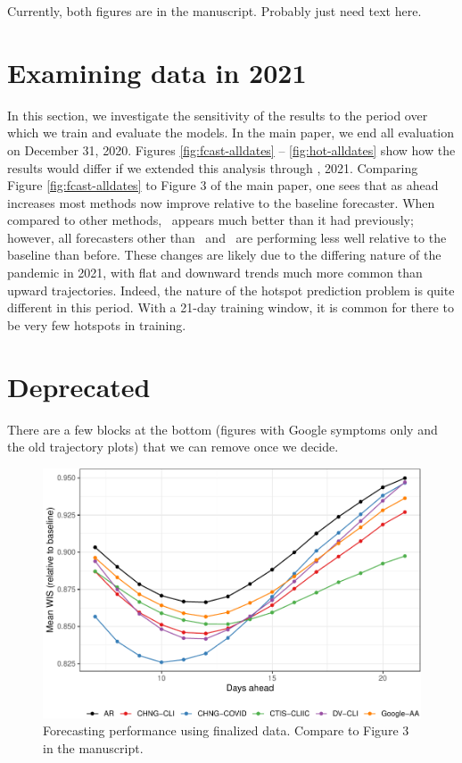 \documentclass[9pt,twoside,lineno]{pnas-new}
\begin{document}
Currently, both figures are in the manuscript. Probably just need text
here.

\hypertarget{examining-data-in-2021}{%
\section{Examining data in 2021}\label{examining-data-in-2021}}

In this section, we investigate the sensitivity of the results to the
period over which we train and evaluate the models.  In the main
paper, we end all evaluation on December 31, 2020.  Figures
\ref{fig:fcast-alldates} -- \ref{fig:hot-alldates} show how the
results would differ if we extended this analysis through , 2021. Comparing Figure \ref{fig:fcast-alldates} to Figure 3 of
the main paper, one sees that as ahead increases most methods now improve
relative to the baseline forecaster. When compared to other methods, \chngcli~appears much better than
it had previously; however, all forecasters other than \chngcov~and
\dv~are performing less well relative to the baseline than before.
These changes are likely due to the differing nature of the pandemic
in 2021, with flat and downward trends much more common than upward
trajectories.  Indeed, the nature of the hotspot prediction problem is
quite different in this period.  With a 21-day training window, it is
common for there to be very few hotspots in training.


\hypertarget{deprecated}{%
\section{Deprecated}\label{deprecated}}

There are a few blocks at the bottom (figures with Google symptoms only
and the old trajectory plots) that we can remove once we decide.

\begin{figure}

{\centering \includegraphics[width=\textwidth]{fig/fcast-finalized-1} 

}

\caption{Forecasting performance using finalized data. Compare to Figure 3 in the manuscript.}\label{fig:fcast-finalized}
\end{figure}
\end{document}
